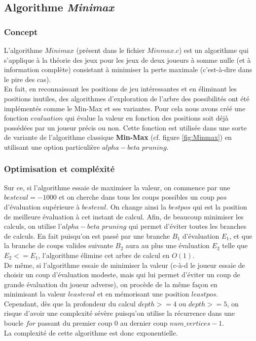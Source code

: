 \documentclass{article}
\begin{document}
 \subsection{Algorithme \textit{Minimax}}
 \subsubsection{Concept}
 L'algorithme $Minimax$ (présent dans le fichier $Minmax.c$) est un algorithme qui s'applique à la théorie des jeux pour les jeux de deux joueurs à somme nulle (et à information complète) consistant à minimiser la perte maximale (c'est-à-dire dans le pire des cas). \\
En fait, en reconnaissant les positions de jeu intéressantes et en éliminant les positions inutiles, des algorithmes d'exploration de l'arbre des possibilités ont été implémentés comme le Min-Max et ses variantes. Pour cela nous avons créé une fonction $evaluation$ qui évalue la valeur en fonction des positions soit déjà possédées par un joueur précis ou non. Cette fonction est utilisée dans une sorte de variante de l'algorithme classique \textbf{Min-Max}  (cf. figure \ref{fig:Minmax}) en utilisant une option particulière $alpha-beta$ $pruning$.\\
\subsubsection{Optimisation et compléxité}
Sur ce, si l'algorithme essaie de maximiser la valeur, on commence par une $besteval=-1000$ et on cherche dans tous les coups possibles un coup $pos$ d'évaluation supérieure à $besteval$. On change ainsi la $bestpos$ qui est la position de meilleure évaluation à cet instant de calcul. Afin, de beaucoup minimiser les calculs, on utilise l'$alpha-beta$ $pruning$ qui permet d'éviter toutes les branches de calculs. En fait puisqu'on est passé par une branche $B_1$ d'évaluation $E_1$, et que la branche de coups valides suivante $B_2$ aura au plus une évaluation $E_2$ telle que $E_2 <= E_1$, l'algorithme élimine cet arbre de calcul en $O(1)$.\\
De même, si l'algorithme essaie de minimiser la valeur (c-à-d le joueur essaie de choisir un coup d'évaluation modeste, mais qui lui permet d'éviter un coup de grande évaluation du joueur adverse), on procède de la même façon en minimisant la valeur $leasteval$ et en mémorisant une position $leastpos$.\\
Cependant, dès que la profondeur du calcul $depth>= 4$ ou $depth>=5$, on risque d'avoir une complexité sévère puisqu'on utilise la récurrence dans une boucle $for$ passant du premier coup $0$ au dernier coup $num\_vertices-1$.\\
La complexité de cette algorithme est donc exponentielle.\\
\end{document}
